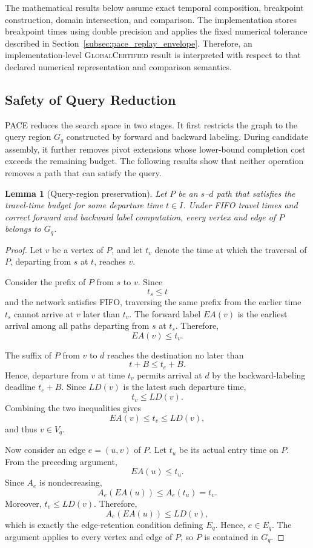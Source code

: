 \documentclass[a4paper,fleqn]{cas-dc}
\newtheorem{lemma}{Lemma}
\begin{document}
The mathematical results below assume exact temporal composition, breakpoint
construction, domain intersection, and comparison. The implementation stores
breakpoint times using double precision and applies the fixed numerical
tolerance described in Section~\ref{subsec:pace_replay_envelope}. Therefore,
an implementation-level \textsc{GlobalCertified} result is interpreted with
respect to that declared numerical representation and comparison semantics.

\subsection{Safety of Query Reduction}
\label{subsec:analysis_reduction}

PACE reduces the search space in two stages. It first restricts the graph to
the query region \(G_q\) constructed by forward and backward labeling. During
candidate assembly, it further removes pivot extensions whose lower-bound
completion cost exceeds the remaining budget. The following results show that
neither operation removes a path that can satisfy the query.

\begin{lemma}[Query-region preservation]
\label{lem:region_preservation}
Let \(P\) be an \(s\)--\(d\) path that satisfies the travel-time budget for
some departure time \(t\in I\). Under FIFO travel times and correct forward
and backward label computation, every vertex and edge of \(P\) belongs to
\(G_q\).
\end{lemma}

\begin{proof}
Let \(v\) be a vertex of \(P\), and let \(t_v\) denote the time at which the
traversal of \(P\), departing from \(s\) at \(t\), reaches \(v\).

Consider the prefix of \(P\) from \(s\) to \(v\). Since
\[
t_s\leq t
\]
and the network satisfies FIFO, traversing the same prefix from the earlier
time \(t_s\) cannot arrive at \(v\) later than \(t_v\). The forward label
\(EA(v)\) is the earliest arrival among all paths departing from \(s\) at
\(t_s\). Therefore,
\[
EA(v)\leq t_v.
\]

The suffix of \(P\) from \(v\) to \(d\) reaches the destination no later than
\[
t+B\leq t_e+B.
\]
Hence, departure from \(v\) at time \(t_v\) permits arrival at \(d\) by the
backward-labeling deadline \(t_e+B\). Since \(LD(v)\) is the latest such
departure time,
\[
t_v\leq LD(v).
\]
Combining the two inequalities gives
\[
EA(v)\leq t_v\leq LD(v),
\]
and thus \(v\in V_q\).

Now consider an edge \(e=(u,v)\) of \(P\). Let \(t_u\) be its actual entry
time on \(P\). From the preceding argument,
\[
EA(u)\leq t_u.
\]
Since \(A_e\) is nondecreasing,
\[
A_e(EA(u))
\leq
A_e(t_u)
=
t_v.
\]
Moreover, \(t_v\leq LD(v)\). Therefore,
\[
A_e(EA(u))\leq LD(v),
\]
which is exactly the edge-retention condition defining \(E_q\). Hence,
\(e\in E_q\). The argument applies to every vertex and edge of \(P\), so
\(P\) is contained in \(G_q\).
\end{proof}
\end{document}
